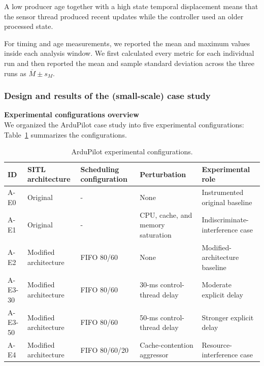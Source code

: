 \noindent A low producer age together with a high state temporal displacement means that the sensor thread produced recent updates while the controller used an older processed state.

\noindent For timing and age measurements, we reported the mean and maximum values inside each analysis window. We first calculated every metric for each individual run and then reported the mean and sample standard deviation across the three runs as \(\overline{M}\pm s_M\).

\subsubsection{Design and results of the (small-scale) case study}
\leavevmode\par
\noindent \textbf{Experimental configurations overview} \\
\noindent We organized the ArduPilot case study into five experimental configurations: Table~\ref{tab:ardupilot-experiments} summarizes the configurations. 

\begin{table}[t]
    \centering
    \caption{ArduPilot experimental configurations.}
    \label{tab:ardupilot-experiments}
    \small
    \begin{tabular}{lllll}
        \toprule
        ID &
        SITL architecture &
        Scheduling configuration &
        Perturbation &
        Experimental role \\
        \midrule

        A-E0 &
        Original &
        - &
        None &
        Instrumented original baseline \\

        A-E1 &
        Original &
        - &
        CPU, cache, and memory saturation &
        Indiscriminate-interference case \\

        A-E2 &
        Modified architecture &
        FIFO 80/60 &
        None &
        Modified-architecture baseline \\

        A-E3-30 &
        Modified architecture &
        FIFO 80/60 &
        30-ms control-thread delay &
        Moderate explicit delay \\

        A-E3-50 &
        Modified architecture &
        FIFO 80/60 &
        50-ms control-thread delay &
        Stronger explicit delay \\

        A-E4 &
        Modified architecture &
        FIFO 80/60/20 &
        Cache-contention aggressor &
        Resource-interference case \\

        \bottomrule
    \end{tabular}
\end{table}

